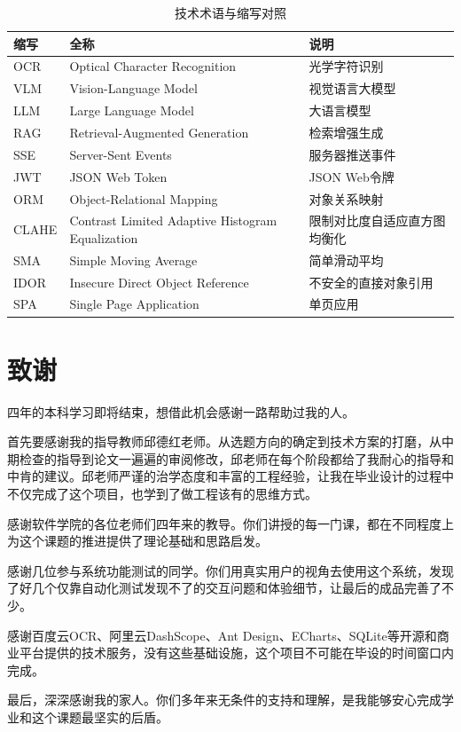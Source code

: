 \documentclass[zihao=-4,a4paper]{ctexart}
\numberwithin{figure}{section}
\numberwithin{table}{section}
\begin{document}
\begin{table}[H]
\centering
\caption{技术术语与缩写对照}
\label{tab:glossary}
\begin{tabular}{lll}
\toprule
\textbf{缩写} & \textbf{全称} & \textbf{说明} \\
\midrule
OCR & Optical Character Recognition & 光学字符识别 \\
VLM & Vision-Language Model & 视觉语言大模型 \\
LLM & Large Language Model & 大语言模型 \\
RAG & Retrieval-Augmented Generation & 检索增强生成 \\
SSE & Server-Sent Events & 服务器推送事件 \\
JWT & JSON Web Token & JSON Web令牌 \\
ORM & Object-Relational Mapping & 对象关系映射 \\
CLAHE & Contrast Limited Adaptive Histogram Equalization & 限制对比度自适应直方图均衡化 \\
SMA & Simple Moving Average & 简单滑动平均 \\
IDOR & Insecure Direct Object Reference & 不安全的直接对象引用 \\
SPA & Single Page Application & 单页应用 \\
\bottomrule
\end{tabular}
\end{table}

\newpage
\section*{致\hspace{2em}谢}

四年的本科学习即将结束，想借此机会感谢一路帮助过我的人。

首先要感谢我的指导教师邱德红老师。从选题方向的确定到技术方案的打磨，从中期检查的指导到论文一遍遍的审阅修改，邱老师在每个阶段都给了我耐心的指导和中肯的建议。邱老师严谨的治学态度和丰富的工程经验，让我在毕业设计的过程中不仅完成了这个项目，也学到了做工程该有的思维方式。

感谢软件学院的各位老师们四年来的教导。你们讲授的每一门课，都在不同程度上为这个课题的推进提供了理论基础和思路启发。

感谢几位参与系统功能测试的同学。你们用真实用户的视角去使用这个系统，发现了好几个仅靠自动化测试发现不了的交互问题和体验细节，让最后的成品完善了不少。

感谢百度云OCR、阿里云DashScope、Ant Design、ECharts、SQLite等开源和商业平台提供的技术服务，没有这些基础设施，这个项目不可能在毕设的时间窗口内完成。

最后，深深感谢我的家人。你们多年来无条件的支持和理解，是我能够安心完成学业和这个课题最坚实的后盾。
\end{document}
